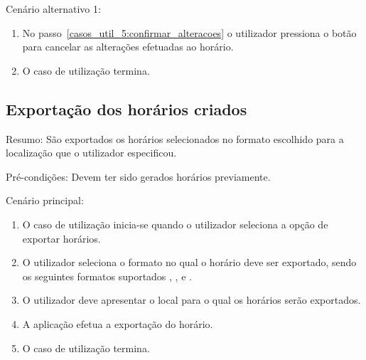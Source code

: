 Cenário alternativo 1:

\begin{enumerate}
    \item No passo~\ref{casos_util_5:confirmar_alteracoes} o utilizador pressiona o botão para cancelar as alterações efetuadas ao horário.
    \item O caso de utilização termina.
\end{enumerate}

\subsection{Exportação dos horários criados}
Resumo: São exportados os horários selecionados no formato escolhido para a localização que o utilizador especificou.

Pré-condições: Devem ter sido gerados horários previamente.

Cenário principal:

\begin{enumerate}
    \item O caso de utilização inicia-se quando o utilizador seleciona a opção de exportar horários.
    \item O utilizador seleciona o formato no qual o horário deve ser exportado, sendo os seguintes formatos suportados , ,  e .
    \item O utilizador deve apresentar o local para o qual os horários serão exportados.
    \item A aplicação efetua a exportação do horário.
    \item O caso de utilização termina.
\end{enumerate}